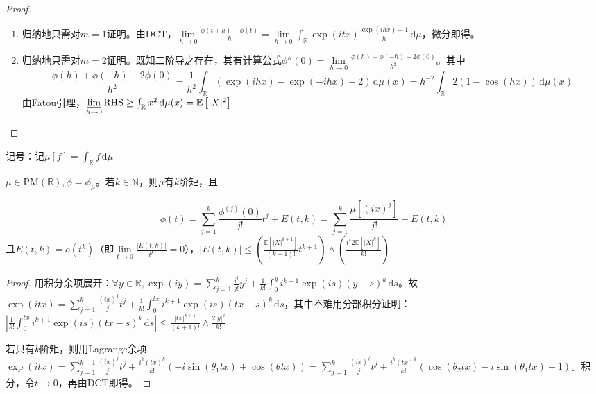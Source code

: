 \documentclass{ctexart}
\begin{document}
\begin{proof}
\begin{enumerate}
\item 归纳地只需对$m=1$证明。由DCT，$\lim\limits_{h\to 0}\frac{\phi(t+h)-\phi(t)}{h}=\lim\limits_{h\to 0}\int_{\mathbb{R}}^{}\exp(itx)\frac{\exp(ihx)-1}{h}  \,\mathrm{d}\mu$，微分即得。
\item 归纳地只需对$m=2$证明。既知二阶导之存在，其有计算公式$\phi''(0)=\lim\limits_{h\to 0}\frac{\phi(h)+\phi(-h)-2\phi(0)}{h^2}$。其中
  \[\frac{\phi(h)+\phi(-h)-2\phi(0)}{h^2}=\frac{1}{h^2}\int_{\mathbb{R}}^{}(\exp(ihx)-\exp(-ihx)-2)  \,\mathrm{d}\mu(x)= h^{-2}\int_{\mathbb{R}}^{} 2(1-\cos(hx)) \,\mathrm{d}\mu(x) \]
  由Fatou引理，$\varliminf\limits_{h\to 0} \mathrm{RHS}\geq \int_{\mathbb{R}}^{} x^2 \,\mathrm{d}\mu(x)= \mathbb{E}\left[ |X|^2 \right] $
\end{enumerate}
\end{proof}

记号：记$\mu \left[ f \right]= \int_{\mathbb{R}}^{}  f \,\mathrm{d}\mu$

\begin{Prop}
  $\mu\in \mathrm{PM}(\mathbb{R}), \phi=\phi_{\mu}$。若$k\in \mathbb{N}$，则$\mu$有$k$阶矩，且

\begin{equation*}
\phi(t)=\sum\limits_{j=1}^k \frac{\phi^{(j)}(0)}{j!}t^j + E(t,k)=\sum\limits_{j=1}^k \frac{\mu \left[ (ix)^j \right]}{j!}+E(t,k)
\end{equation*}
且$E(t,k)=o(t^k)$（即$\lim\limits_{t\to 0} \frac{|E(t,k)|}{t^k}=0$），$|E(t,k)|\leq (\frac{\mathbb{E}\left[ |X|^{k+1}\right] }{(k+1)!}t^{k+1})\land (\frac{t^k 2\mathbb{E}\left[ |X|^k \right] }{k!})$

\end{Prop}

\begin{proof}
  用积分余项展开：$\forall y\in \mathbb{R}, \exp(iy)= \sum\limits_{j=1}^k \frac{i^j}{j!}y^j +\frac{1}{k!}\int_0^y i^{k+1}\exp(is)(y-s)^k \,\mathrm{d}s$。故$\exp(itx)=\sum\limits_{j=1}^k \frac{(ix)^j}{j!} t^j +\frac{1}{k!}\int_0^{tx} i^{k+1}\exp(is)(tx-s)^k \,\mathrm{d}s$，其中不难用分部积分证明：$|\frac{1}{k!}\int_0^{tx} i^{k+1}\exp(is)(tx-s)^k \,\mathrm{d}s|\leq \frac{|tx|^{k+1}}{(k+1)!}\land \frac{2|y|^k}{k!}$

  若只有$k$阶矩，则用Lagrange余项$\exp(itx)=\sum\limits_{j=1}^{k-1} \frac{(ix)^j}{j!}t^j +\frac{i^k(tx)^k}{k!}(-i\sin(\theta_1 tx)+\cos(\theta tx))=\sum\limits_{j=1}^k \frac{(ix)^j}{j!}t^j +\frac{i^k(tx)^k}{k!}(\cos(\theta_2 tx)-i\sin(\theta_1 tx)-1)$。积分，令$t\to 0$，再由DCT即得。
\end{proof}
\end{document}
